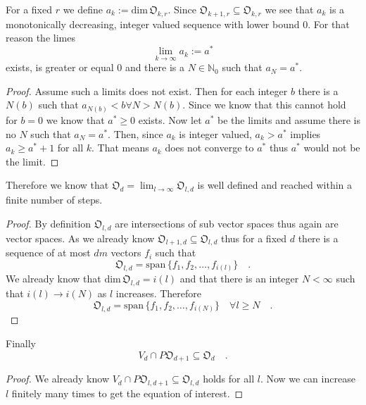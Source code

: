 \begin{remark}{}{}
	For a fixed $r$ we define $a_k := \text{dim}\, \mathfrak{O}_{k,r}$. 
	Since $\mathfrak{O}_{k+1,r} \subseteq \mathfrak{O}_{k,r}$ 
	we see that $a_k$ is a monotonically decreasing, integer valued sequence with 
	lower bound $0$.
	For that reason the limes
	\begin{equation}
	\lim\limits_{k\to \infty}a_k := a^*
	\end{equation}
	exists, is greater or equal $0$ and there is a $N\in\mathbb{N}_0$ such that $a_N=a^*$.
	\begin{proof}
	Assume such a limits does not exist. Then for each integer $b$ there is a 
	$N(b)$ such that $a_{N(b)} < b \forall N>N(b)$. Since we know that this cannot 
	hold for $b=0$ we know that $a^*\geq 0$ exists. Now let $a^*$ be the limits and 
	assume there is no $N$ such that 
	$a_N=a^*$. Then, since $a_k$ is integer valued, $a_k > a^* $ implies $a_k \geq a^*+1$ 
	for all $k$. That means $a_k$ does not converge to $a^*$ thus $a^*$ would not be
	the limit. 
	\end{proof}		
	Therefore we know that $\mathfrak{O}_d = \lim_{l\to\infty}\mathfrak{O}_{l,d}$ 
	is well defined and reached within a finite number of steps. 
	\begin{proof}
	By definition $\mathfrak{O}_{l,d}$ are intersections of sub vector spaces thus again 
	are vector spaces. As we already know $\mathfrak{O}_{l+1,d}\subseteq 
	\mathfrak{O}_{l,d}$ thus for a fixed $d$ there is a sequence of at most $dm$ vectors 
	$f_i$ such that
	\begin{equation}
	\mathfrak{O}_{l,d} = \text{span}\, \{f_1,f_2,\ldots, f_{i(l)}\} \quad .
	\end{equation}
	We already know that $\text{dim}\,\mathfrak{O}_{l,d}=i(l)$ and that there is an 
	integer $N<\infty$ such that $i(l)\to i(N)$ as $l$ increases. Therefore
	\begin{equation}
	\mathfrak{O}_{l,d} = \text{span}\, 
	\{f_1,f_2,\ldots, f_{i(N)}\} \quad 	\forall l\geq N \quad .
	\end{equation}
	\end{proof}
	Finally 
	\begin{equation}
	V_d \cap P\mathfrak{O}_{d+1} \subseteq \mathfrak{O}_d \quad .
	\end{equation}
	\begin{proof}
	We already know $V_d \cap P\mathfrak{O}_{l,d+1} \subseteq \mathfrak{O}_{l,d}$ holds 
	for all $l$. Now we can increase $l$ finitely many times to get the equation of 
	interest.
	\end{proof}
\end{remark}

